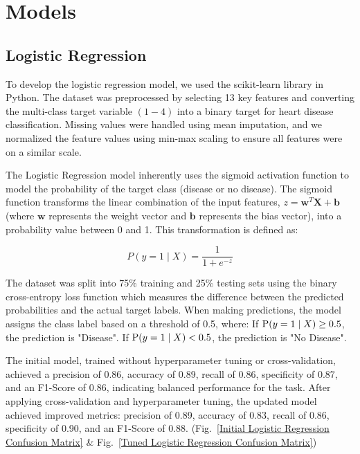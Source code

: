 \section{Models}

\subsection{Logistic Regression}
To develop the logistic regression model, we used the scikit-learn library in Python. The dataset was preprocessed by selecting 13 key features and converting the multi-class target variable $(1 - 4)$ into a binary target for heart disease classification. Missing values were handled using mean imputation, and we normalized the feature values using min-max scaling to ensure all features were on a similar scale.

The Logistic Regression model inherently uses the sigmoid activation function to model the probability of the target class (disease or no disease). The sigmoid function transforms the linear combination of the input features, $z = \mathbf{w}^{T}\mathbf{X} + \mathbf{b}$ (where \(\mathbf{w}\) represents the weight vector and \(\mathbf{b}\) represents the bias vector), into a probability value between 0 and 1. This transformation is defined as:

\[
P(y=1 \mid X) = \frac{1}{1 + e^{-z}}
\]

The dataset was split into 75\% training and 25\% testing sets using the binary cross-entropy loss function which measures the difference between the predicted probabilities and the actual target labels. When making predictions, the model assigns the class label based on a threshold of 0.5, where: 
If $\textnormal{P}(y=1 \mid X) \geq 0.5$,  the prediction is "Disease".
If $\textnormal{P}(y=1 \mid X) < 0.5$, the prediction is "No Disease".

The initial model, trained without hyperparameter tuning or cross-validation, achieved a precision of 0.86, accuracy of 0.89, recall of 0.86, specificity of 0.87, and an F1-Score of 0.86, indicating balanced performance for the task. After applying cross-validation and hyperparameter tuning, the updated model achieved improved metrics: precision of 0.89, accuracy of 0.83, recall of 0.86, specificity of 0.90, and an F1-Score of 0.88. (Fig.~\ref{Initial Logistic Regression Confusion Matrix} \& Fig.~\ref{Tuned Logistic Regression Confusion Matrix})

